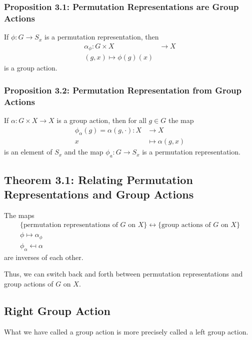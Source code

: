 \documentclass{article}
\begin{document}
\subsubsection{Proposition 3.1: Permutation Representations are Group Actions}
\begin{idea}
    If $\phi:G\rightarrow S_x$ is a permutation representation, then
    \begin{align*}
        \alpha_\phi:G\times X & \rightarrow X \\
        (g,x) \mapsto \phi(g)(x)
    \end{align*}
    is a group action.
\end{idea}
\subsubsection{Proposition 3.2: Permutation Representation from Group Actions}
\begin{idea}
    If $\alpha:G\times X \rightarrow X$ is a group action, then for all $g\in G$ the map
    \begin{align*}
        \phi_\alpha(g) = \alpha(g,\cdot): X & \rightarrow X       \\
        x                                   & \mapsto \alpha(g,x)
    \end{align*}
    is an element of $S_x$ and the map $\phi_a:G\rightarrow S_x$ is a permutation representation.
\end{idea}
\subsection{Theorem 3.1: Relating Permutation Representations and Group Actions}
\begin{idea}
    The maps
    \begin{align*}
        \{\text{permutation representations of $G$ on $X$}\} \leftrightarrow \{\text{group actions of $G$ on $X$}\} \\
        \phi \mapsto \alpha_\phi                                                                                    \\
        \phi_\alpha \mapsfrom \alpha
    \end{align*}
    are inverses of each other.
\end{idea}
Thus, we can switch back and forth between permutation representations and group actions of $G$ on $X$.
\subsection{Right Group Action}
What we have called a group action is more precisely called a left group action.
\end{document}
